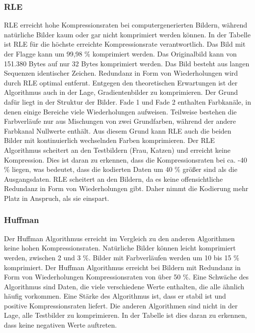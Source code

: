 \documentclass[conference]{IEEEtran}
\begin{document}
\subsubsection{RLE}

RLE erreicht hohe Kompressionsraten bei computergenerierten Bildern, während natürliche
Bilder kaum oder gar nicht komprimiert werden können.
In der Tabelle ist RLE für die höchste erreichte Kompressionsrate verantwortlich.
Das Bild mit der Flagge kann um 99,98 \% komprimiert werden.
Das Originalbild kann von 151.380 Bytes auf nur 32 Bytes komprimiert werden.
Das Bild besteht aus langen Sequenzen identischer Zeichen. Redundanz in Form von
Wiederholungen wird durch RLE optimal entfernt.
Entgegen den theoretischen Erwartungen ist der Algorithmus auch in der Lage,
Gradientenbilder zu komprimieren. Der Grund dafür liegt in der Struktur der Bilder.
Fade 1 und Fade 2 enthalten Farbkanäle, in denen einige Bereiche viele Wiederholungen aufweisen.
Teilweise bestehen die Farbverläufe nur aus Mischungen von zwei Grundfarben, während der
andere Farbkanal Nullwerte enthält.
Aus diesem Grund kann RLE auch die beiden Bilder mit kontinuierlich wechselnden Farben 
komprimieren.
Der RLE Algorithmus scheitert an den Testbildern (Frau, Katzen) und erreicht keine
Kompression.
Dies ist daran zu erkennen, dass die Kompressionsraten bei ca. -40 \% liegen, was
bedeutet, dass die kodierten Daten um 40 \% größer sind als die Ausgangsdaten.
RLE scheitert an den Bildern, da es keine offensichtliche Redundanz in Form von Wiederholungen gibt.
Daher nimmt die Kodierung mehr Platz in Anspruch, als sie einspart.


\subsubsection{Huffman}

Der Huffman Algorithmus erreicht im Vergleich zu den anderen Algorithmen keine
hohen Kompressionsraten.
Natürliche Bilder können leicht komprimiert werden, zwischen 2 und 3 \%.
Bilder mit Farbverläufen werden um 10 bis 15 \% komprimiert.
Der Huffman Algorithmus erreicht bei Bildern mit Redundanz in Form von
Wiederholungen Kompressionsraten von über 50 \%.
Eine Schwäche des Algorithmus sind Daten, die viele verschiedene Werte enthalten,
die alle ähnlich häufig vorkommen.
Eine Stärke des Algorithmus ist, dass er stabil ist und positive Kompressionsraten liefert.
Die anderen Algorithmen sind nicht in der Lage, alle Testbilder zu komprimieren.
In der Tabelle ist dies daran zu erkennen, dass keine negativen Werte auftreten.
\end{document}

